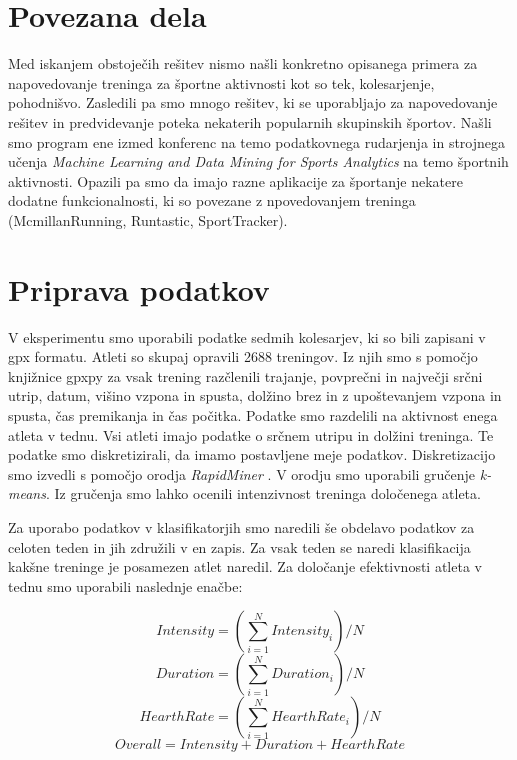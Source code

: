 \documentclass{acm_proc_article-sp}
\begin{document}
\section{Povezana dela}
Med iskanjem obstoječih rešitev nismo našli konkretno opisanega primera 
za napovedovanje treninga za športne aktivnosti kot so tek, kolesarjenje,
pohodnišvo. Zasledili pa smo mnogo rešitev, ki se uporabljajo za napovedovanje
rešitev in predvidevanje poteka nekaterih popularnih skupinskih športov.
Našli smo program ene izmed konferenc na temo podatkovnega rudarjenja in 
strojnega učenja \textit{Machine Learning and Data Mining for Sports Analytics} \cite{mladmfsport} na temo športnih aktivnosti.
Opazili pa smo da imajo razne aplikacije za športanje nekatere dodatne funkcionalnosti,
ki so povezane z npovedovanjem treninga (McmillanRunning, Runtastic, SportTracker).


\section{Priprava podatkov}
V eksperimentu smo uporabili podatke sedmih kolesarjev, ki so bili zapisani v gpx formatu. Atleti so skupaj opravili 2688 treningov. Iz njih smo s pomočjo knjižnice gpxpy za vsak trening razčlenili trajanje, povprečni in največji srčni utrip, datum, višino vzpona in spusta, dolžino brez in z upoštevanjem vzpona in spusta, čas premikanja in čas počitka. 
Podatke smo razdelili na aktivnost enega atleta v tednu.
Vsi atleti imajo podatke o srčnem utripu in dolžini treninga.
Te podatke smo diskretizirali, da imamo postavljene meje podatkov.
Diskretizacijo smo izvedli s pomočjo orodja \textit{RapidMiner} \cite{rapidminer}.
V orodju smo uporabili gručenje \textit{k-means}. Iz gručenja smo lahko ocenili intenzivnost treninga določenega atleta.

Za uporabo podatkov v klasifikatorjih smo naredili še obdelavo podatkov za celoten teden in jih združili v en zapis.
Za vsak teden se naredi klasifikacija kakšne treninge je posamezen atlet naredil.
Za določanje efektivnosti atleta v tednu smo uporabili naslednje enačbe: 

\begin{equation}
Intensity = (\sum_{i=1}^{N} Intensity_i) / N
\end{equation}
\begin{equation}
Duration = (\sum_{i=1}^{N} Duration_i) / N
\end{equation}
\begin{equation}
HearthRate = (\sum_{i=1}^{N} HearthRate_i) / N
\end{equation}
\begin{equation} \label{eq:overall}
Overall = Intensity + Duration + HearthRate
\end{equation}
\end{document}
